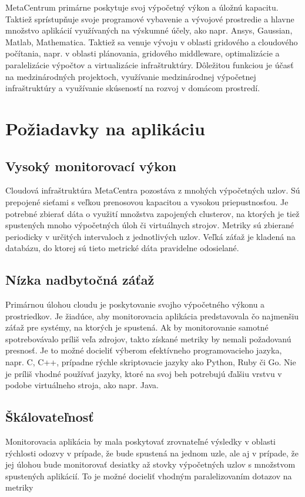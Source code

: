\documentclass[11pt,final,oneside]{fithesis}
\begin{document}
MetaCentrum primárne poskytuje svoj výpočetný výkon a úložnú kapacitu. Taktiež sprístupňuje svoje programové vybavenie a vývojové prostredie a hlavne množstvo aplikácií využívaných na výskumné účely, ako napr. 
Ansys, Gaussian, Matlab, Mathematica. Taktiež sa venuje vývoju v oblasti gridového a cloudového počítania, napr. v oblasti plánovania, gridového middleware, optimalizácie a paralelizácie výpočtov a virtualizácie
infraštruktúry. Dôležitou funkciou je účasť na medzinárodných projektoch, využívanie medzinárodnej výpočetnej infraštruktúry a využívanie skúseností na rozvoj v domácom prostredí.

\section{Požiadavky na aplikáciu}
\subsection{Vysoký monitorovací výkon}
Cloudová infraštruktúra MetaCentra pozostáva z mnohých výpočetných uzlov. Sú prepojené sieťami s veľkou prenosovou kapacitou a vysokou priepustnosťou. Je potrebné zbierať dáta o využití množstva zapojených
clusterov, na ktorých je tiež spustených mnoho výpočetných úloh či virtuálnych strojov. Metriky sú zbierané periodicky v určitých intervaloch z jednotlivých uzlov. Veľká záťaž je kladená na databázu, do ktorej
sú tieto metrické dáta pravidelne odosielané.

\subsection{Nízka nadbytočná záťaž}
Primárnou úlohou cloudu je poskytovanie svojho výpočetného výkonu a prostriedkov. Je žiadúce, aby monitorovacia aplikácia predstavovala čo najmenšiu záťaž pre systémy, na ktorých je spustená. Ak by monitorovanie
samotné spotrebovávalo príliš veľa zdrojov, takto získané metriky by nemali požadovanú presnosť. Je to možné docieliť výberom efektívneho programovacieho jazyka, napr. C, C++, prípadne rýchle skriptovacie 
jazyky ako Python, Ruby či Go. Nie je príliš vhodné používať jazyky, ktoré na svoj beh potrebujú ďalšiu vrstvu v podobe virtuálneho stroja, ako napr. Java.

\subsection{Škálovateľnosť}
Monitorovacia aplikácia by mala poskytovať zrovnateľné výsledky v oblasti rýchlosti odozvy v prípade, že bude spustená na jednom uzle, ale aj v prípade, že jej úlohou bude monitorovať desiatky až stovky 
výpočetných uzlov s množstvom spustených aplikácií. To je možné docieliť vhodným paralelizovaním dotazov na metriky
\end{document}
